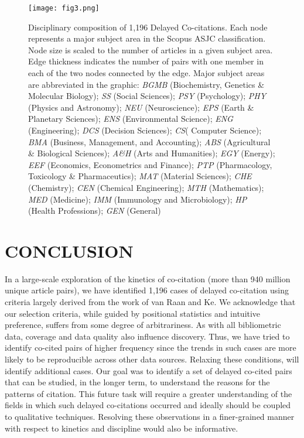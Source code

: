 \documentclass[utf8]{frontiersSCNS}
\begin{document}
\begin{figure}[h!]
\begin{center}
\texttt{[image: fig3.png]}%
\end{center}
\caption{Disciplinary composition of 1,196 Delayed Co-citations. Each node represents a major subject area in the Scopus ASJC classification. Node size is scaled to the number of articles in a given subject area. Edge thickness indicates the number of pairs with one member in each of the two nodes connected by the edge. Major subject areas are abbreviated in the graphic:
\emph{BGMB} (Biochemistry, Genetics \& Molecular Biology);
\emph{SS} (Social Sciences);
\emph{PSY} (Psychology);
\emph{PHY} (Physics and Astronomy);
\emph{NEU} (Neuroscience);
\emph{EPS} (Earth \& Planetary Sciences);
\emph{ENS} (Environmental Science);
\emph{ENG} (Engineering);
\emph{DCS} (Decision Sciences);
\emph{CS}( Computer Science);
\emph{BMA} (Business, Management, and Accounting);
\emph{ABS} (Agricultural \& Biological Sciences); 
\emph{A\&H} (Arts and Humanities);
\emph{EGY} (Energy);
\emph{EEF} (Economics, Econometrics and Finance);
\emph{PTP} (Pharmacology, Toxicology \& Pharmaceutics);
\emph{MAT} (Material Sciences);
\emph{CHE} (Chemistry);
\emph{CEN} (Chemical Engineering);
\emph{MTH} (Mathematics);
\emph{MED} (Medicine);
\emph{IMM} (Immunology and Microbiology);
\emph{HP} (Health Professions);
\emph{GEN} (General)}
\label{fig:fig3}
\end{figure}

\clearpage
 
\section{CONCLUSION} In a large-scale exploration of the kinetics of co-citation (more than 940 million unique article pairs), we have identified 1,196 cases of delayed co-citation using criteria largely derived from the work of van Raan and Ke. We acknowledge that our selection criteria, while guided by positional statistics and intuitive preference, suffers from some degree of arbitrariness.  As with all bibliometric data, coverage and data quality also influence discovery. Thus, we have tried to identify co-cited pairs of higher frequency since the trends in such cases are more likely to be reproducible across other data sources. Relaxing these conditions, will identify additional cases. Our goal was to identify a set of delayed co-cited pairs that can be studied, in the longer term, to understand the reasons for the patterns of citation. This future task will require a greater understanding of the fields in which such delayed co-citations occurred and ideally should be coupled to qualitative techniques. Resolving these observations in a finer-grained manner with respect to kinetics and discipline would also be informative. 
\end{document}
